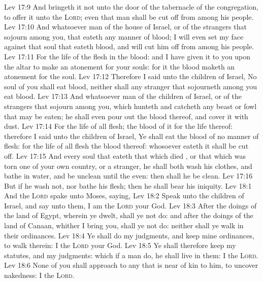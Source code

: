 \vs Lev 17:9 And bringeth it not unto the door of the tabernacle of the congregation, to offer it unto the \textsc{Lord}; even that man shall be cut off from among his people.
\vs Lev 17:10 And whatsoever man  of the house of Israel, or of the strangers that sojourn among you, that eateth any manner of blood; I will even set my face against that soul that eateth blood, and will cut him off from among his people.
\vs Lev 17:11 For the life of the flesh  in the blood: and I have given it to you upon the altar to make an atonement for your souls: for it  the blood  maketh an atonement for the soul.
\vs Lev 17:12 Therefore I said unto the children of Israel, No soul of you shall eat blood, neither shall any stranger that sojourneth among you eat blood.
\vs Lev 17:13 And whatsoever man  of the children of Israel, or of the strangers that sojourn among you, which hunteth and catcheth any beast or fowl that may be eaten; he shall even pour out the blood thereof, and cover it with dust.
\vs Lev 17:14 For  the life of all flesh; the blood of it  for the life thereof: therefore I said unto the children of Israel, Ye shall eat the blood of no manner of flesh: for the life of all flesh  the blood thereof: whosoever eateth it shall be cut off.
\vs Lev 17:15 And every soul that eateth that which died , or that which was torn  one of your own country, or a stranger, he shall both wash his clothes, and bathe  in water, and be unclean until the even: then shall he be clean.
\vs Lev 17:16 But if he wash  not, nor bathe his flesh; then he shall bear his iniquity.
\vs Lev 18:1 And the \textsc{Lord} spake unto Moses, saying,
\vs Lev 18:2 Speak unto the children of Israel, and say unto them, I am the \textsc{Lord} your God.
\vs Lev 18:3 After the doings of the land of Egypt, wherein ye dwelt, shall ye not do: and after the doings of the land of Canaan, whither I bring you, shall ye not do: neither shall ye walk in their ordinances.
\vs Lev 18:4 Ye shall do my judgments, and keep mine ordinances, to walk therein: I  the \textsc{Lord} your God.
\vs Lev 18:5 Ye shall therefore keep my statutes, and my judgments: which if a man do, he shall live in them: I  the \textsc{Lord}.
\vs Lev 18:6 None of you shall approach to any that is near of kin to him, to uncover  nakedness: I  the \textsc{Lord}.
